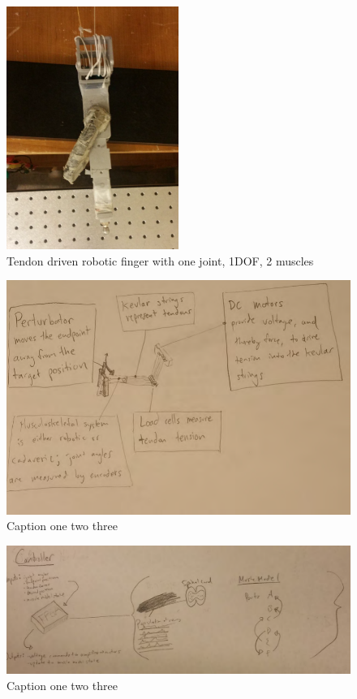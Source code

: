 \begin{figure}[schematic_finger_overhead]
  \label{fig:schematic_finger_overhead}
  \centering
  \includegraphics[width=0.5\textwidth]{figures/overhead_robotic_finger.pdf}
  \caption{Tendon driven robotic finger with one joint, 1DOF, 2 muscles}
\end{figure}

\begin{figure}[hardware_schematic]
  \label{fig:hardware_schematic}
  \centering
  \includegraphics[width=1.0\textwidth]{figures/hardware_schematic.pdf}
  \caption{Caption one two three}
\end{figure}

\begin{figure}[fpga_schematic]
  \label{fig:fpga_schematic}
  \centering
  \includegraphics[width=1.0\textwidth]{figures/fpga_schematic.pdf}
  \caption{Caption one two three}
\end{figure}


